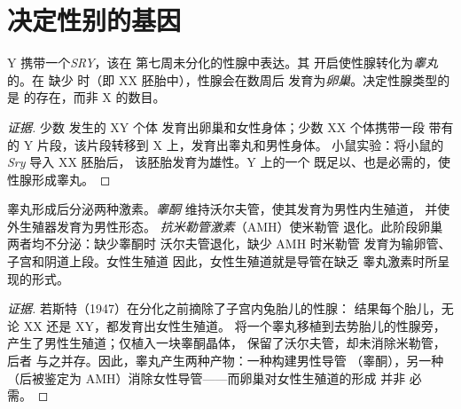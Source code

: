 \section{决定性别的基因}

\begin{proposition}[SRY与性腺]\label{prop:g11:becoming-male-female:sry}
Y 携带一个\emph{SRY}，该在
第七周未分化的性腺中表达。其
开启使性腺转化为\emph{睾丸}的。在
缺少  时（即 XX 胚胎中），性腺会在数周后
发育为\emph{卵巢}。决定性腺类型的是
 的存在，而非 X 的数目。
\end{proposition}
\begin{proof}[证据]
少数  发生的 XY 个体
发育出卵巢和女性身体；少数 XX 个体携带一段
带有  的 Y 片段，该片段转移到 X 上，发育出睾丸和男性身体。
小鼠实验：将小鼠的 \emph{Sry} 导入 XX 胚胎后，
该胚胎发育为雄性。Y 上的一个
既足以、也是必需的，使性腺形成睾丸。
\end{proof}

\begin{proposition}[胎儿睾丸的激素]\label{prop:g11:becoming-male-female:hormones}
睾丸形成后分泌两种激素。\emph{睾酮}
维持沃尔夫管，使其发育为男性内生殖道，
并使外生殖器发育为男性形态。
\emph{抗米勒管激素}（AMH）使米勒管
退化。此阶段卵巢两者均不分泌：缺少睾酮时
沃尔夫管退化，缺少 AMH 时米勒管
发育为输卵管、子宫和阴道上段。女性生殖道
因此，女性生殖道就是导管在缺乏
睾丸激素时所呈现的形式。
\end{proposition}
\begin{proof}[证据]
若斯特（1947）在分化之前摘除了子宫内兔胎儿的性腺：
结果每个胎儿，无论 XX 还是 XY，都发育出女性生殖道。
将一个睾丸移植到去势胎儿的性腺旁，
产生了男性生殖道；仅植入一块睾酮晶体，
保留了沃尔夫管，却未消除米勒管，后者
与之并存。因此，睾丸产生两种产物：一种构建男性导管
（睾酮），另一种（后被鉴定为 AMH）消除女性导管——而卵巢对女性生殖道的形成
并非
必需。
\end{proof}

